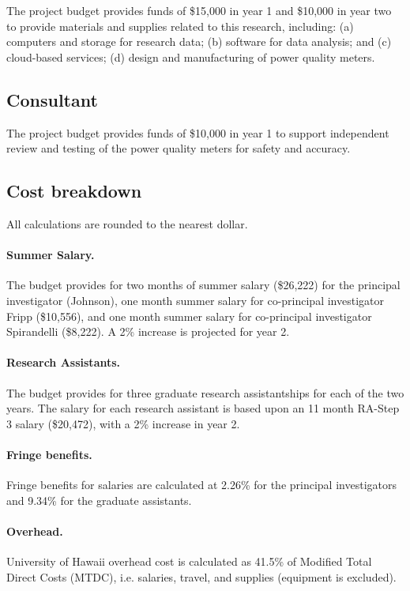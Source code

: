The project budget provides funds of \$15,000 in year 1 and \$10,000 in year two to provide materials and supplies related to this research, including: (a) computers and storage for research data; (b) software for data analysis; and (c) cloud-based services; (d) design and manufacturing of power quality meters.

\subsection*{Consultant}

The project budget provides funds of \$10,000 in year 1 to support independent review and testing of the power quality meters for safety and accuracy.

\subsection*{Cost breakdown}
\label{cost-breakdown}

All calculations are rounded to the nearest dollar.

\paragraph{Summer Salary.}  
The budget provides for two months of summer salary (\$26,222) for the principal investigator (Johnson),
one month summer salary for co-principal investigator Fripp (\$10,556), and one month
summer salary for co-principal investigator Spirandelli (\$8,222). 
A 2\% increase is projected for year 2.

\paragraph*{Research Assistants.}  
The budget provides for three graduate research assistantships
for each of the two years.  The salary for each research assistant is
based upon an 11 month RA-Step 3 salary (\$20,472), with a 
2\% increase in year 2.

\paragraph*{Fringe benefits.} 
Fringe benefits for salaries are calculated at 2.26\% for the principal
investigators and 9.34\% for the graduate assistants.

\paragraph*{Overhead.}  
University of Hawaii overhead cost is calculated as 41.5\% of Modified Total
Direct Costs (MTDC), i.e. salaries, travel, and supplies (equipment is
excluded).





